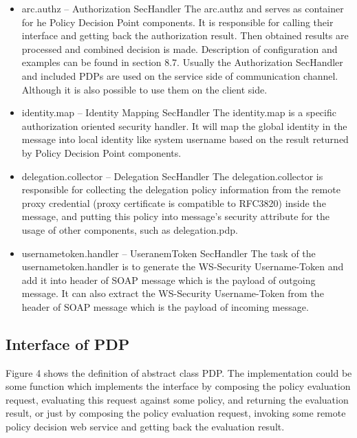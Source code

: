 \documentclass{book}
\begin{document}
\begin{itemize}
    \item arc.authz – Authorization SecHandler
The arc.authz and serves as container for he Policy Decision Point components. It is responsible for calling their interface and getting back the authorization result. Then obtained results are processed and   combined decision is made. Description of configuration and examples can be found in section 8.7. Usually the Authorization SecHandler and included PDPs are used on the service side of communication channel. Although it is also possible to use them on the client side.

    \item identity.map – Identity Mapping SecHandler
The identity.map is a specific authorization oriented security handler. It will map the global identity in the message into local identity like system username based on the result returned by Policy Decision Point components.

    \item delegation.collector – Delegation SecHandler
The delegation.collector is responsible for collecting the delegation policy information from the remote proxy credential (proxy certificate is compatible to RFC3820) inside the message, and putting this policy into message’s security attribute for the usage of other components, such as  delegation.pdp.

    \item usernametoken.handler – UseranemToken SecHandler
The task of the  usernametoken.handler is to generate the WS-Security Username-Token and add it into header of SOAP message which is the payload of outgoing message. It can also extract the WS-Security Username-Token from the header of SOAP message which is the payload of incoming message.

\end{itemize}


\subsection{Interface of PDP} %
\label{subsec:interface_pdp}

Figure 4 shows the definition of abstract class PDP. The implementation could be some function which implements the interface by composing the policy evaluation request, evaluating this request against some policy, and returning the evaluation result, or just by composing the policy evaluation request, invoking some remote policy decision web service and getting back the evaluation result.
\end{document}
